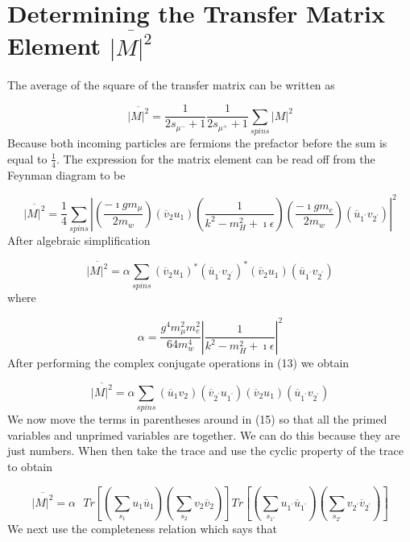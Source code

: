 \documentclass{article}
\begin{document}
\section{Determining the Transfer Matrix Element $\overline{\left|M\right|^2}$}
The average of the square of the transfer matrix can be written as

\begin{equation}
\overline{\left|M\right|^2}=\frac{1}{2s_{{\mu}^{-}}+1}\frac{1}{2s_{{\mu}^{+}}+1}\sum_{spins} \left|M\right|^2
\end{equation}
Because both incoming particles are fermions the prefactor before the sum is equal to $\frac{1}{4}$.  The expression for the matrix element can be read off from the Feynman diagram to be

\begin{equation}
\overline{\left|M\right|^2}=\frac{1}{4}\sum_{spins} \left|\left(\frac{-\imath gm_\mu}{2m_w}\right)\left(\overline{v}_2u_1\right)\left(\frac{1}{k^2-m_H^2+\imath\epsilon}\right)\left(\frac{-\imath gm_e}{2m_w}\right)\left(\overline{u}_{1^{'}}v_{2^{'}}\right)\right|^2
\end{equation}
After algebraic simplification


\begin{equation}
\overline{\left|M\right|^2}=\alpha\sum_{spins}\left(\overline{v}_2u_1\right)^*\left(\overline{u}_{1^{'}}v_{2^{'}}\right)^*\left(\overline{v}_2u_1\right)\left(\overline{u}_{1^{'}}v_{2^{'}}\right)
\end{equation}
where

\begin{equation}
\alpha=\frac{g^4m_\mu^2m_e^2}{64m_w^4}\left|\frac{1}{k^2-m_H^2+\imath\epsilon}\right|^2
\end{equation}
After performing the complex conjugate operations in (13) we obtain

\begin{equation}
\overline{\left|M\right|^2}=\alpha\sum_{spins} \left(\overline{u}_1v_2\right)\left(\overline{v}_{2^{'}}u_{1^{'}}\right)\left(\overline{v}_2u_1\right)\left(\overline{u}_{1^{'}}v_{2^{'}}\right)
\end{equation}
We now move the terms in parentheses around in (15) so that all the primed variables and unprimed variables are together.  We can do this because they are just numbers.  When then take the trace and use the cyclic property of the trace to obtain

\begin{equation}
\overline{\left|M\right|^2}=\alpha\text{  } Tr\left[\left(\sum_{s_1}u_1\overline{u}_1\right)\left(\sum_{s_2}v_2\overline{v}_2\right)\right]Tr\left[\left(\sum_{s_{1'}}u_{1^{'}}\overline{u}_{1^{'}}\right)\left(\sum_{s_{2'}}v_{2^{'}}\overline{v}_{2^{'}}\right)\right]
\end{equation}
We next use the completeness relation which says that
\end{document}

